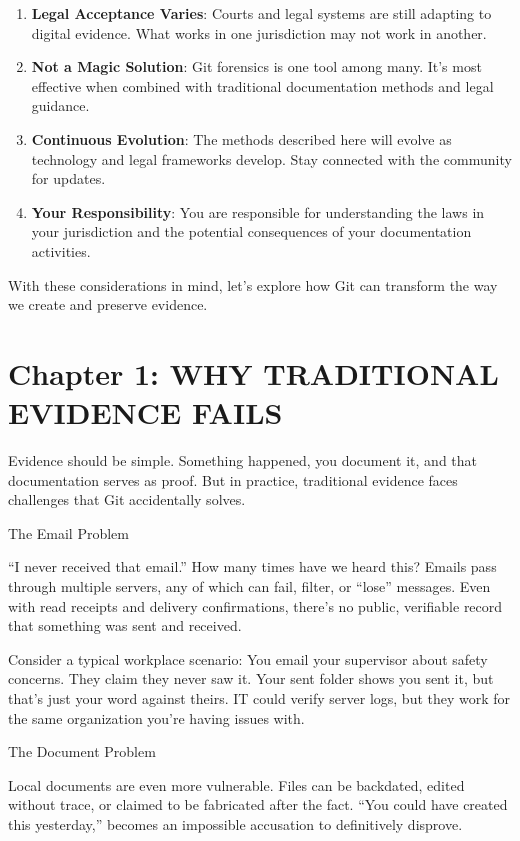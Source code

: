 \begin{enumerate}
\def\labelenumi{\arabic{enumi}.}
\item
  \textbf{Legal Acceptance Varies}: Courts and legal systems are still
  adapting to digital evidence. What works in one jurisdiction may not
  work in another.
\item
  \textbf{Not a Magic Solution}: Git forensics is one tool among many.
  It's most effective when combined with traditional documentation
  methods and legal guidance.
\item
  \textbf{Continuous Evolution}: The methods described here will evolve
  as technology and legal frameworks develop. Stay connected with the
  community for updates.
\item
  \textbf{Your Responsibility}: You are responsible for understanding
  the laws in your jurisdiction and the potential consequences of your
  documentation activities.
\end{enumerate}

With these considerations in mind, let's explore how Git can transform
the way we create and preserve evidence.

\section{Chapter 1: WHY TRADITIONAL EVIDENCE
FAILS}\label{chapter-1-why-traditional-evidence-fails}

Evidence should be simple. Something happened, you document it, and that
documentation serves as proof. But in practice, traditional evidence
faces challenges that Git accidentally solves.

The Email Problem

``I never received that email.'' How many times have we heard this?
Emails pass through multiple servers, any of which can fail, filter, or
``lose'' messages. Even with read receipts and delivery confirmations,
there's no public, verifiable record that something was sent and
received.

Consider a typical workplace scenario: You email your supervisor about
safety concerns. They claim they never saw it. Your sent folder shows
you sent it, but that's just your word against theirs. IT could verify
server logs, but they work for the same organization you're having
issues with.

The Document Problem

Local documents are even more vulnerable. Files can be backdated, edited
without trace, or claimed to be fabricated after the fact. ``You could
have created this yesterday,'' becomes an impossible accusation to
definitively disprove.

